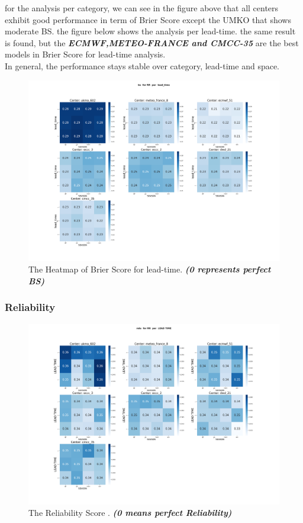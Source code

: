 for the analysis per category, we can see in the figure above that all centers exhibit good performance in term of Brier Score except the UMKO that shows moderate BS.
the figure below shows the analysis per lead-time. the same result is found, but the \textbf{\textit{ECMWF,METEO-FRANCE and CMCC-35}} are the best models in Brier Score for lead-time analysis. \\ 
In general, the performance stays stable over category, lead-time and space.


\begin{figure}[H]
    \centering
    \includegraphics[scale=0.25]{plots/prob/bs/bs_RR_lead_time.png}
    \caption{The Heatmap of Brier Score for lead-time. \textbf{\textit{(0 represents perfect BS)}}}
\end{figure}




\subsubsection{Reliability}

\begin{figure}[H]
    \centering
    \includegraphics[scale=0.25]{plots/prob/rela/rela_RR.png}
    \caption{The Reliability Score  . \textbf{\textit{(0 means perfect Reliability)}}}
\end{figure}

